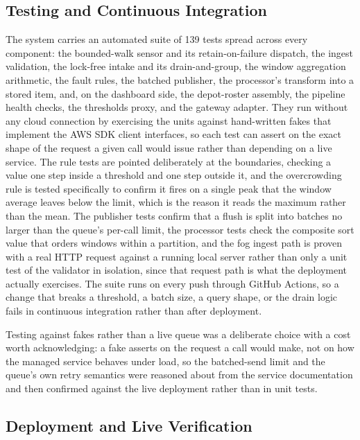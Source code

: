 \documentclass[conference]{IEEEtran}
\begin{document}
\subsection{Testing and Continuous Integration}

The system carries an automated suite of 139 tests spread across every component: the bounded-walk sensor and its retain-on-failure dispatch, the ingest validation, the lock-free intake and its drain-and-group, the window aggregation arithmetic, the fault rules, the batched publisher, the processor's transform into a stored item, and, on the dashboard side, the depot-roster assembly, the pipeline health checks, the thresholds proxy, and the gateway adapter. They run without any cloud connection by exercising the units against hand-written fakes that implement the AWS SDK client interfaces, so each test can assert on the exact shape of the request a given call would issue rather than depending on a live service. The rule tests are pointed deliberately at the boundaries, checking a value one step inside a threshold and one step outside it, and the overcrowding rule is tested specifically to confirm it fires on a single peak that the window average leaves below the limit, which is the reason it reads the maximum rather than the mean. The publisher tests confirm that a flush is split into batches no larger than the queue's per-call limit, the processor tests check the composite sort value that orders windows within a partition, and the fog ingest path is proven with a real HTTP request against a running local server rather than only a unit test of the validator in isolation, since that request path is what the deployment actually exercises. The suite runs on every push through GitHub Actions, so a change that breaks a threshold, a batch size, a query shape, or the drain logic fails in continuous integration rather than after deployment.

Testing against fakes rather than a live queue was a deliberate choice with a cost worth acknowledging: a fake asserts on the request a call would make, not on how the managed service behaves under load, so the batched-send limit and the queue's own retry semantics were reasoned about from the service documentation \cite{awssqs} and then confirmed against the live deployment rather than in unit tests.

\subsection{Deployment and Live Verification}
\end{document}
